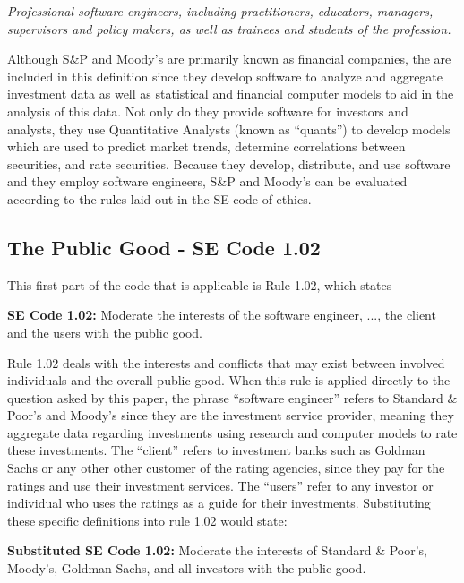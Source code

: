 \documentclass[11pt]{article}
\begin{document}
\begin{multicols}{2}
\textit{Professional software engineers, including practitioners, educators, managers, supervisors and policy makers, as well as trainees and students of the profession.}
\newline

Although S\&P and Moody's are primarily known as financial companies, the are included in this definition since they develop software to analyze and aggregate investment data \cite{SnP, Moodys} as well as statistical and financial computer models to aid in the analysis of this data. \cite{govtReport} Not only do they provide software for investors and analysts, they use Quantitative Analysts (known as ``quants'') to develop models which are used to predict market trends, determine correlations between securities, and rate securities. \cite{quantsRole, govtReport, wiredFormula}  Because they develop, distribute, and use software and they employ software engineers, S\&P and Moody's can be evaluated according to the rules laid out in the SE code of ethics. 

\subsection{The Public Good - SE Code 1.02}
This first part of the code that is applicable is Rule 1.02, which states
 
\begin{framed}
\noindent
   \textbf{SE Code 1.02: }     
   \newline
   Moderate the interests of the software engineer, ..., the client and the users with the public good. \cite{SEcode}
\end{framed}

Rule 1.02 deals with the interests and conflicts that may exist between involved individuals and the overall public good.  When this rule is applied directly to the question asked by this paper, the phrase ``software engineer'' refers to Standard \& Poor's and Moody's since they are the investment service provider, meaning they aggregate data regarding investments using research and computer models to rate these investments. The ``client'' refers to investment banks such as Goldman Sachs or any other other customer of the rating agencies, since they pay for the ratings and use their investment services.  The ``users'' refer to any investor or individual who uses the ratings as a guide for their investments.  Substituting these specific definitions into rule 1.02 would state:

\begin{framed}
\noindent
   \textbf{Substituted SE Code 1.02: }  
   \newline
   Moderate the interests of Standard \& Poor's, Moody's, Goldman Sachs, and all investors with the public good.
\end{framed}


\end{multicols}
\end{document}
